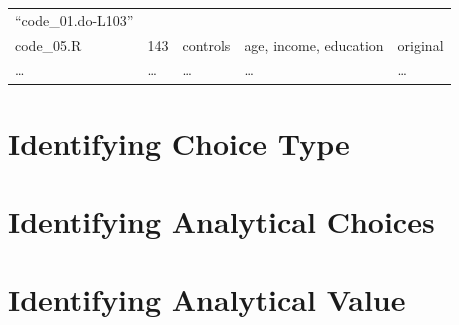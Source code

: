 \documentclass[]{book}
\begin{document}
\begin{longtable}[]{@{}lllll@{}}
\begin{minipage}[t]{0.18\columnwidth}
``code\_01.do-L103''\strut
\end{minipage}\tabularnewline
\begin{minipage}[t]{0.10\columnwidth}\raggedright
code\_05.R\strut
\end{minipage} & \begin{minipage}[t]{0.11\columnwidth}\raggedright
143\strut
\end{minipage} & \begin{minipage}[t]{0.18\columnwidth}\raggedright
controls\strut
\end{minipage} & \begin{minipage}[t]{0.28\columnwidth}\raggedright
age, income, education\strut
\end{minipage} & \begin{minipage}[t]{0.18\columnwidth}\raggedright
original\strut
\end{minipage}\tabularnewline
\begin{minipage}[t]{0.10\columnwidth}\raggedright
\ldots{}\strut
\end{minipage} & \begin{minipage}[t]{0.11\columnwidth}\raggedright
\ldots{}\strut
\end{minipage} & \begin{minipage}[t]{0.18\columnwidth}\raggedright
\ldots{}\strut
\end{minipage} & \begin{minipage}[t]{0.28\columnwidth}\raggedright
\ldots{}\strut
\end{minipage} & \begin{minipage}[t]{0.18\columnwidth}\raggedright
\ldots{}\strut
\end{minipage}\tabularnewline
\bottomrule
\end{longtable}

\hypertarget{id-analy}{%
\section{Identifying Choice Type}\label{id-analy}}

\hypertarget{id-analy}{%
\section{Identifying Analytical Choices}\label{id-analy}}

\hypertarget{id-val}{%
\section{Identifying Analytical Value}\label{id-val}}
\end{document}
